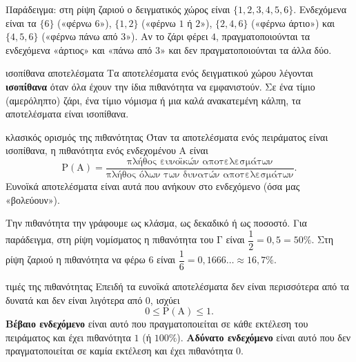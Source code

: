 Παράδειγμα: στη ρίψη ζαριού ο δειγματικός χώρος είναι $\{1,2,3,4,5,6\}$. Ενδεχόμενα είναι τα $\{6\}$ («φέρνω $6$»), $\{1,2\}$ («φέρνω $1$ ή $2$»), $\{2,4,6\}$ («φέρνω άρτιο») και $\{4,5,6\}$ («φέρνω πάνω από $3$»). Αν το ζάρι φέρει $4$, πραγματοποιούνται τα ενδεχόμενα «άρτιος» και «πάνω από $3$» και δεν πραγματοποιούνται τα άλλα δύο.

\begin{orismos}{ισοπίθανα αποτελέσματα}
Τα αποτελέσματα ενός δειγματικού χώρου λέγονται \textbf{ισοπίθανα} όταν όλα έχουν την ίδια πιθανότητα να εμφανιστούν. Σε ένα τίμιο (αμερόληπτο) ζάρι, ένα τίμιο νόμισμα ή μια καλά ανακατεμένη κάλπη, τα αποτελέσματα είναι ισοπίθανα.
\end{orismos}

\begin{kanonas}{κλασικός ορισμός της πιθανότητας}
Όταν τα αποτελέσματα ενός πειράματος είναι ισοπίθανα, η πιθανότητα ενός ενδεχομένου $\mathrm{Α}$ είναι
$$\mathrm{Ρ}(\mathrm{Α})=\frac{\text{πλήθος ευνοϊκών αποτελεσμάτων}}{\text{πλήθος όλων των δυνατών αποτελεσμάτων}}.$$
Ευνοϊκά αποτελέσματα είναι αυτά που ανήκουν στο ενδεχόμενο (όσα μας «βολεύουν»).
\end{kanonas}

Την πιθανότητα την γράφουμε ως κλάσμα, ως δεκαδικό ή ως ποσοστό. Για παράδειγμα, στη ρίψη νομίσματος η πιθανότητα του $\mathrm{Γ}$ είναι $\dfrac{1}{2}=0{,}5=50\%$. Στη ρίψη ζαριού η πιθανότητα να φέρω $6$ είναι $\dfrac{1}{6}=0{,}1666\ldots\approx16{,}7\%$.

\begin{idiotita}{τιμές της πιθανότητας}
Επειδή τα ευνοϊκά αποτελέσματα δεν είναι περισσότερα από τα δυνατά και δεν είναι λιγότερα από $0$, ισχύει
$$0\le\mathrm{Ρ}(\mathrm{Α})\le1.$$
\textbf{Βέβαιο ενδεχόμενο} είναι αυτό που πραγματοποιείται σε κάθε εκτέλεση του πειράματος και έχει πιθανότητα $1$ (ή $100\%$). \textbf{Αδύνατο ενδεχόμενο} είναι αυτό που δεν πραγματοποιείται σε καμία εκτέλεση και έχει πιθανότητα $0$.
\end{idiotita}

\begin{center}
\end{center}

